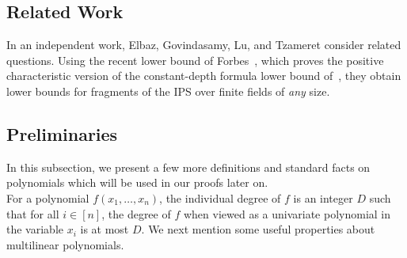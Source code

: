 \documentclass[11pt]{article}
\begin{document}
\subsection{Related Work}
\label{sec:related}
In an independent work, Elbaz, Govindasamy, Lu, and Tzameret \cite{EGLT-25} consider related questions. Using the recent lower bound of Forbes~\cite{Forbes-LST-CCC}, which proves the positive characteristic version of the constant-depth formula lower bound of~\cite{LST}, they obtain lower bounds for fragments of the IPS over finite fields of \emph{any} size.























































\subsection{Preliminaries}
In this subsection, we present a few more definitions and standard facts on polynomials which will be used in our proofs later on.\\

\noindent
For a polynomial $f(x_{1},\ldots,x_{n})$, the individual degree of $f$ is an integer $D$ such that for all $i \in [n]$, the degree of $f$ when viewed as a univariate polynomial in the variable $x_{i}$ is at most $D$.\newline
We next mention some useful properties about multilinear polynomials.\\
\end{document}
